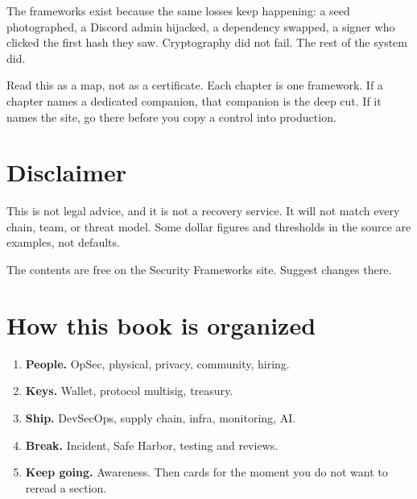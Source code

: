 The frameworks exist because the same losses keep
happening: a seed photographed, a Discord admin hijacked,
a dependency swapped, a signer who clicked the first
hash they saw. Cryptography did not fail. The rest of
the system did.

Read this as a map, not as a certificate. Each chapter
is one framework. If a chapter names a dedicated
companion, that companion is the deep cut. If it names
the site, go there before you copy a control into
production.

\section{Disclaimer}

This is not legal advice, and it is not a recovery
service. It will not match every chain, team, or threat
model. Some dollar figures and thresholds in the source
are examples, not defaults.

The contents are free on the Security Frameworks site.
Suggest changes there.

\section{How this book is organized}

\begin{enumerate}
  \item \textbf{People.} OpSec, physical, privacy,
  community, hiring.
  \item \textbf{Keys.} Wallet, protocol multisig,
  treasury.
  \item \textbf{Ship.} DevSecOps, supply chain, infra,
  monitoring, AI.
  \item \textbf{Break.} Incident, Safe Harbor, testing
  and reviews.
  \item \textbf{Keep going.} Awareness. Then cards for
  the moment you do not want to reread a section.
\end{enumerate}
